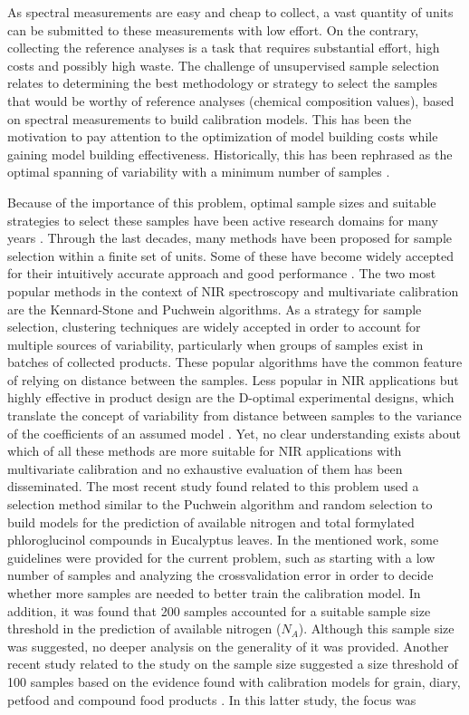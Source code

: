\documentclass[journal=ancham,manuscript=article]{achemso}
\begin{document}
As spectral measurements are easy and cheap to collect, a vast quantity of units can be submitted to these measurements with low effort. On the contrary, collecting the reference analyses is a task that requires substantial effort, high costs and possibly high waste. The challenge of unsupervised sample selection relates to determining the best methodology or strategy to select the samples that would be worthy of reference analyses (chemical composition values), based on spectral measurements to build calibration models.
This has been the motivation to pay attention to the optimization of model building costs while gaining model building effectiveness. Historically, this has been rephrased as the optimal spanning of variability with a minimum number of samples \cite{Naes1990, Saeys2019,Kennard1969}.

Because of the importance of this problem, optimal sample sizes and suitable strategies to select these samples have been active research domains for many years \cite{Ferre1996,Au2020, Liu2019}. Through the last decades, many methods have been proposed for sample selection within a finite set of units. Some of these have become widely accepted for their intuitively accurate approach and good performance \cite{Shetty2012a, Nawar2018, He2015}. The two most popular methods in the context of NIR spectroscopy and multivariate calibration are the Kennard-Stone\cite{Kennard1969} and  Puchwein\cite{Puchwein1988} algorithms. As a strategy for sample selection, clustering techniques are widely accepted in order to account for multiple sources of variability\cite{Naes1990}, particularly when groups of samples exist in batches of collected products\cite{Bobelyn2010}. These popular algorithms have the common feature of relying on distance between the samples. Less popular in NIR applications but highly effective in product design are the D-optimal experimental designs, which translate the concept of variability from distance between samples to the variance of the coefficients of an assumed model \cite{Goos2011}. Yet, no clear understanding exists about which of all these methods are more suitable for NIR applications with multivariate calibration and no exhaustive evaluation of them has been disseminated. The most recent study found related to this problem used a selection method similar to the Puchwein algorithm and random selection to build models for the prediction of available nitrogen and total formylated phloroglucinol compounds in Eucalyptus leaves\cite{Au2020}. In the mentioned work, some guidelines were provided for the current problem, such as starting with a low number of samples and analyzing the crossvalidation error in order to decide whether more samples are needed to better train the calibration model. In addition, it was found that 200 samples accounted for a suitable sample size threshold in the prediction of available nitrogen ($N_{A}$)\cite{Au2020}. Although this sample size was suggested, no deeper analysis on the generality of it was provided. Another recent study related to the study on the sample size suggested a size threshold of 100 samples based on the evidence found with calibration models for grain, diary, petfood and compound food products \cite{Schoot2020}. In this latter study, the focus was 
\end{document}
